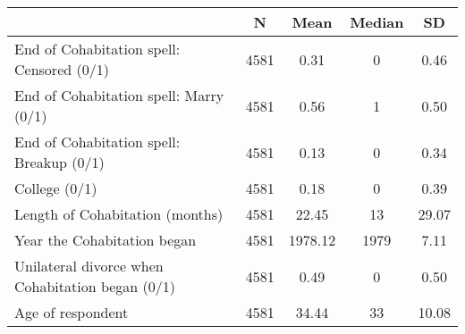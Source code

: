 {
\def\sym#1{\ifmmode^{#1}\else\(^{#1}\)\fi}
\begin{tabular}{l*{1}{cccc}}
\toprule
                    &           N&        Mean&      Median&          SD\\
\midrule
End of Cohabitation spell: Censored (0/1)&        4581&        0.31&           0&        0.46\\
End of Cohabitation spell: Marry (0/1)&        4581&        0.56&           1&        0.50\\
End of Cohabitation spell: Breakup (0/1)&        4581&        0.13&           0&        0.34\\
College (0/1)       &        4581&        0.18&           0&        0.39\\
Length of Cohabitation (months)&        4581&       22.45&          13&       29.07\\
Year the Cohabitation began&        4581&     1978.12&        1979&        7.11\\
Unilateral divorce when Cohabitation began (0/1)&        4581&        0.49&           0&        0.50\\
Age of respondent   &        4581&       34.44&          33&       10.08\\
\bottomrule
\end{tabular}
}
